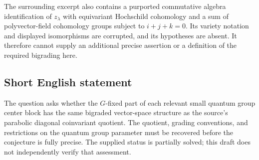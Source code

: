 \documentclass[11pt]{article}
\begin{document}
The surrounding excerpt also contains a purported commutative algebra identification of \(z_\lambda\) with equivariant Hochschild cohomology and a sum of polyvector-field cohomology groups subject to \(i+j+k=0\). Its variety notation and displayed isomorphisms are corrupted, and its hypotheses are absent. It therefore cannot supply an additional precise assertion or a definition of the required bigrading here.
\subsection{Short English statement}
The question asks whether the \(G\)-fixed part of each relevant small quantum group center block has the same bigraded vector-space structure as the source's parabolic diagonal coinvariant quotient. The quotient, grading conventions, and restrictions on the quantum group parameter must be recovered before the conjecture is fully precise. The supplied status is partially solved; this draft does not independently verify that assessment.
\end{document}
